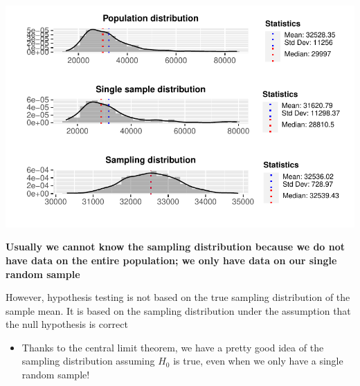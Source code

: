 \documentclass[
  letterpaper,
  DIV=11,
  numbers=noendperiod]{scrartcl}
\newenvironment{Shaded}{\begin{snugshade}}{\end{snugshade}}
\newcommand{\AttributeTok}[1]{\textcolor[rgb]{0.40,0.45,0.13}{#1}}
\newcommand{\DecValTok}[1]{\textcolor[rgb]{0.68,0.00,0.00}{#1}}
\newcommand{\FunctionTok}[1]{\textcolor[rgb]{0.28,0.35,0.67}{#1}}
\newcommand{\NormalTok}[1]{\textcolor[rgb]{0.00,0.23,0.31}{#1}}
\newcommand{\SpecialCharTok}[1]{\textcolor[rgb]{0.37,0.37,0.37}{#1}}
\newcommand{\StringTok}[1]{\textcolor[rgb]{0.13,0.47,0.30}{#1}}
\providecommand{\tightlist}{%
  \setlength{\itemsep}{0pt}\setlength{\parskip}{0pt}}\usepackage{longtable,booktabs,array}
\begin{document}
\begin{Shaded}
\end{Shaded}

\includegraphics{SSS_5.1-Lecture_files/figure-pdf/unnamed-chunk-7-1.pdf}

\textbf{Usually we cannot know the sampling distribution because we do
not have data on the entire population; we only have data on our single
random sample}

However, hypothesis testing is not based on the true sampling
distribution of the sample mean. It is based on the sampling
distribution under the assumption that the null hypothesis is correct

\begin{itemize}
\tightlist
\item
  Thanks to the central limit theorem, we have a pretty good idea of the
  sampling distribution assuming \(H_0\) is true, even when we only have
  a single random sample!
\end{itemize}
\end{document}
